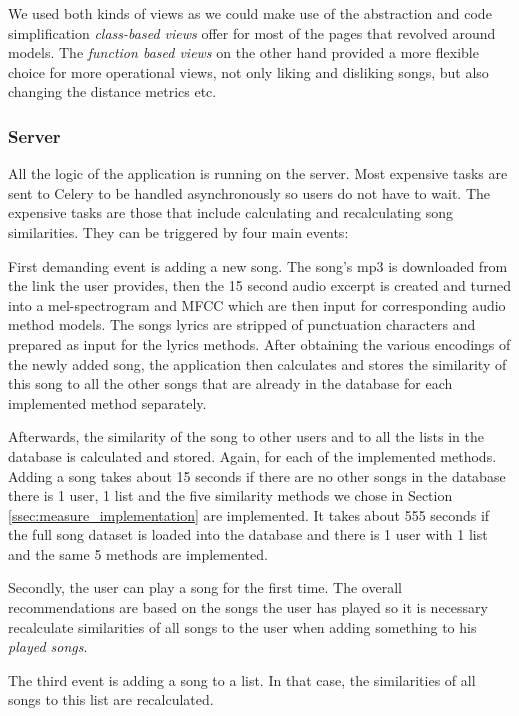 We used both kinds of views as we could make use of the abstraction and code simplification \textit{class-based views} offer for most of the pages that revolved around models. The \textit{function based views} on the other hand provided a more flexible choice for more operational views, not only liking and disliking songs, but also changing the distance metrics etc. 

\subsubsection{Server}\label{sssec:server}

All the logic of the application is running on the server. Most expensive tasks are sent to Celery to be handled asynchronously so users do not have to wait. 
The expensive tasks are those that include calculating and recalculating song similarities. They can be triggered by four main events:

First demanding event is adding a new song. The song's mp3 is downloaded from the link the user provides, then the 15 second audio excerpt is created and turned into a mel-spectrogram and MFCC which are then input for corresponding audio method models. The songs lyrics are stripped of punctuation characters and prepared as input for the lyrics methods. After obtaining the various encodings of the newly added song, the application then calculates and stores the similarity of this song to all the other songs that are already in the database for each implemented method separately.

Afterwards, the similarity of the song to other users and to all the lists in the database is calculated and stored. Again, for each of the implemented methods. Adding a song takes about 15 seconds if there are no other songs in the database there is 1 user, 1 list and the five similarity methods we chose in Section \ref{ssec:measure_implementation} are implemented. It takes about 555 seconds if the full song dataset is loaded into the database and there is 1 user with 1 list and the same 5 methods are implemented. 

Secondly, the user can play a song for the first time. The overall recommendations are based on the songs the user has played so it is necessary recalculate similarities of all songs to the user when adding something to his \textit{played songs}.

The third event is adding a song to a list. In that case, the similarities of all songs to this list are recalculated. 

